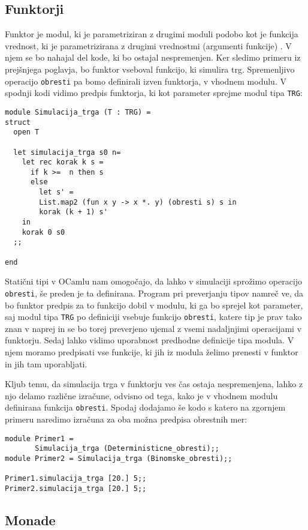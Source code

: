 \documentclass[a4paper,12pt]{article}
\theoremstyle{definition} %
\begin{document}
\subsection{Funktorji}

Funktor je modul, ki je parametriziran z drugimi moduli podobo kot je funkcija vrednost, ki je parametrizirana z drugimi vrednostmi (argumenti funkcije) \cite{OCaml}. V njem se bo nahajal del kode, ki bo ostajal nespremenjen. Ker sledimo primeru iz prejšnjega poglavja, bo funktor vseboval funkcijo, ki simulira trg. Spremenljivo operacijo \lstinline{obresti} pa bomo definirali izven funktorja, v vhodnem modulu. 
V spodnji kodi vidimo predpis funktorja, ki kot parameter sprejme modul tipa \lstinline{TRG}:
\begin{lstlisting}
module Simulacija_trga (T : TRG) =
struct
  open T

  let simulacija_trga s0 n=
    let rec korak k s =
      if k >=  n then s
      else
        let s' = 
        List.map2 (fun x y -> x *. y) (obresti s) s in
        korak (k + 1) s'
    in
    korak 0 s0
  ;;

end
\end{lstlisting}
Statični tipi v OCamlu nam omogočajo, da lahko v simulaciji sprožimo operacijo \lstinline{obresti}, še preden je ta definirana. Program pri preverjanju tipov namreč ve, da bo funktor predpis za to funkcijo dobil v modulu, ki ga bo sprejel kot parameter, saj modul tipa \lstinline{TRG} po definiciji vsebuje funkcijo \lstinline{obresti}, katere tip je prav tako znan v naprej in se bo torej preverjeno ujemal z vsemi nadaljnjimi operacijami v funktorju. Sedaj lahko vidimo uporabnost predhodne definicije tipa modula. V njem moramo predpisati vse funkcije, ki jih iz modula želimo prenesti v funktor in jih tam uporabljati.

Kljub temu, da simulacija trga v funktorju ves čas ostaja nespremenjena, lahko z njo delamo različne izračune, odvisno od tega, kako je v vhodnem modulu definirana funkcija \lstinline{obresti}.
Spodaj dodajamo še kodo s katero na zgornjem primeru naredimo izračuna za oba možna predpisa obrestnih mer:
\begin{lstlisting}
module Primer1 = 
       Simulacija_trga (Deterministicne_obresti);;
module Primer2 = Simulacija_trga (Binomske_obresti);;

Primer1.simulacija_trga [20.] 5;;
Primer2.simulacija_trga [20.] 5;;
\end{lstlisting}

\subsection{Monade}
\end{document}
